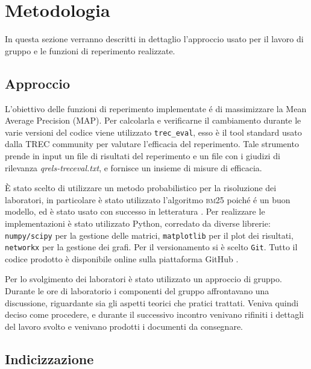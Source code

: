 \section{Metodologia}
\label{sec:metodologia}

In questa sezione verranno descritti in dettaglio l'approccio usato per il lavoro di gruppo e le funzioni di reperimento realizzate.


\subsection{Approccio}
\label{sec:approccio}

L'obiettivo delle funzioni di reperimento implementate \'e di massimizzare la Mean Average Precision (\textsc{MAP}). Per calcolarla e verificarne il cambiamento durante le varie versioni del codice viene utilizzato \texttt{trec\_eval}, esso \`e il tool standard usato dalla TREC community per valutare l'efficacia del reperimento. Tale strumento prende in input un file di risultati del reperimento e un file con i giudizi di rilevanza \textit{qrels-treceval.txt}, e fornisce un insieme di misure di efficacia.

\`E stato scelto di utilizzare un metodo probabilistico per la risoluzione dei laboratori, in particolare \`e stato utilizzato l'algoritmo \textsc{bm25} \cite{melucci2013information} poich\'e \'e un buon modello, ed \`e stato usato con successo in letteratura \cite{croft2010search}.  Per realizzare le implementazioni \`e stato utilizzato Python, corredato da diverse librerie: \texttt{numpy/scipy} per la gestione delle matrici, \texttt{matplotlib} per il plot dei risultati, \texttt{networkx} per la gestione dei grafi.
Per il versionamento si \`e scelto \texttt{Git}. Tutto il codice prodotto \`e disponibile online sulla piattaforma GitHub \cite{repoonline}. 

Per lo svolgimento dei laboratori \`e stato utilizzato un approccio di gruppo. Durante le ore di laboratorio i componenti del gruppo affrontavano una discussione, riguardante sia gli aspetti teorici che pratici trattati. Veniva quindi deciso come procedere, e durante il successivo incontro venivano rifiniti i dettagli del lavoro svolto e venivano prodotti i documenti da consegnare.

\subsection{Indicizzazione} \label{sec:metodi-di-indic}

